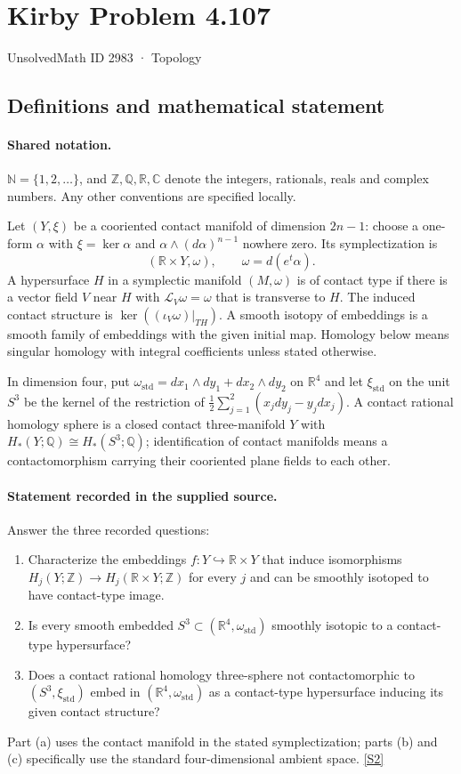 \documentclass[11pt]{article}
\newcommand{\sref}[2]{\hyperlink{source:#1:#2}{[S#2]}}
\begin{document}
\setcounter{section}{2982}
\section{Kirby Problem 4.107}\label{2983}
{\small\sffamily UnsolvedMath ID 2983 · Topology}
\subsection{Definitions and mathematical statement}

\paragraph{Shared notation.}$\mathbb N=\{1,2,\ldots\}$, and $\mathbb Z,\mathbb Q,\mathbb R,\mathbb C$ denote the integers, rationals, reals and complex numbers. Any other conventions are specified locally.


Let $(Y,\xi)$ be a cooriented contact manifold of dimension $2n-1$: choose a one-form $\alpha$ with $\xi=\ker\alpha$ and $\alpha\wedge(d\alpha)^{n-1}$ nowhere zero. Its symplectization is
\[
(\mathbb R\times Y,\omega),\qquad \omega=d(e^t\alpha).
\]
A hypersurface $H$ in a symplectic manifold $(M,\omega)$ is of contact type if there is a vector field $V$ near $H$ with $\mathcal L_V\omega=\omega$ that is transverse to $H$. The induced contact structure is $\ker((\iota_V\omega)|_{TH})$. A smooth isotopy of embeddings is a smooth family of embeddings with the given initial map. Homology below means singular homology with integral coefficients unless stated otherwise.

In dimension four, put $\omega_{\mathrm{std}}=dx_1\wedge dy_1+dx_2\wedge dy_2$ on $\mathbb R^4$ and let $\xi_{\mathrm{std}}$ on the unit $S^3$ be the kernel of the restriction of $\tfrac12\sum_{j=1}^2(x_jdy_j-y_jdx_j)$. A contact rational homology sphere is a closed contact three-manifold $Y$ with $H_*(Y;\mathbb Q)\cong H_*(S^3;\mathbb Q)$; identification of contact manifolds means a contactomorphism carrying their cooriented plane fields to each other.
\paragraph{Statement recorded in the supplied source.}
Answer the three recorded questions:
\begin{enumerate}
\item[(a)] Characterize the embeddings $f:Y\hookrightarrow\mathbb R\times Y$ that induce isomorphisms $H_j(Y;\mathbb Z)\to H_j(\mathbb R\times Y;\mathbb Z)$ for every $j$ and can be smoothly isotoped to have contact-type image.
\item[(b)] Is every smooth embedded $S^3\subset(\mathbb R^4,\omega_{\mathrm{std}})$ smoothly isotopic to a contact-type hypersurface?
\item[(c)] Does a contact rational homology three-sphere not contactomorphic to $(S^3,\xi_{\mathrm{std}})$ embed in $(\mathbb R^4,\omega_{\mathrm{std}})$ as a contact-type hypersurface inducing its given contact structure?
\end{enumerate}
Part (a) uses the contact manifold in the stated symplectization; parts (b) and (c) specifically use the standard four-dimensional ambient space. \sref{2983}{2}
\end{document}
